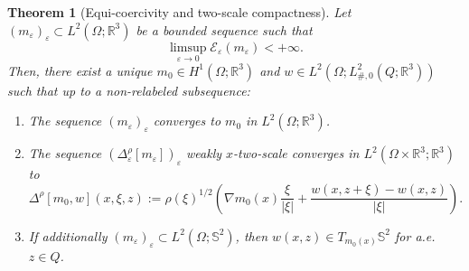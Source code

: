 \documentclass[reqno,11pt]{amsart}
\numberwithin{equation}{section}
\theoremstyle{thmlemcorr}
\newtheorem{theorem}{Theorem}
\numberwithin{theorem}{section}
\theoremstyle{thmlemcorr*}
\theoremstyle{defi}
\theoremstyle{remexample}
\theoremstyle{ass}
\newcommand{\R}{\mathbb{R}}
\renewcommand{\S}{\mathbb{S}}
\newcommand{\Ecal}{\mathcal{E}}
\renewcommand{\epsilon}{\varepsilon}
\newcommand{\1}{\mathds{1}}
\newcommand{\veps}{\varepsilon}
\newcommand{\hidde}[1]{{\textcolor{orange}{$\langle\hspace{-0.3ex}\langle$Hidde: #1$\rangle\hspace{-0.3ex}\rangle$}}}
\begin{document}
\begin{theorem}[Equi-coercivity and two-scale compactness]\label{th:2scale}
    Let $(m_\epsilon)_\epsilon \subset L^2(\Omega;\R^3)$ be a bounded sequence such that 
    \begin{equation}\label{eq:bound}
    \limsup_{\epsilon \to 0} \Ecal_\epsilon(m_\epsilon) < +\infty.
    \end{equation}
    Then, there exist a unique $m_0 \in H^1(\Omega;\R^3)$ and $w \in L^2(\Omega;L^2_{\#,0}(Q;\R^3))$ such that up to a non-relabeled subsequence:
    \begin{enumerate}[label=(\roman*)]
    \item \label{it:2scalei} The sequence $(m_\epsilon)_\epsilon$ converges to $m_0$ in $L^2(\Omega;\R^3)$.
        
        \item \label{it:2scaleii} The sequence $(\Delta_\epsilon^\rho[m_\veps])_\veps$ weakly $x$-two-scale converges in $L^2(\Omega\times\R^3;\R^3)$ to
    \begin{equation}\label{eq:vform}
    \Delta^\rho[m_0,w](x,\xi,z):=\rho(\xi)^{1/2}\left(\nabla m_0(x)\frac{\xi}{|\xi|}+\frac{w(x,z+\xi)-w(x,z)}{|\xi|}\right).
    \end{equation}
    \item \label{it:2scaleiii} If additionally $(m_\epsilon)_\epsilon \subset L^2(\Omega;\S^2)$, then $w(x,z) \in T_{m_0(x)}\S^2$ for a.e.~$z\in Q$.
    \end{enumerate}
\end{theorem}
\end{document}
